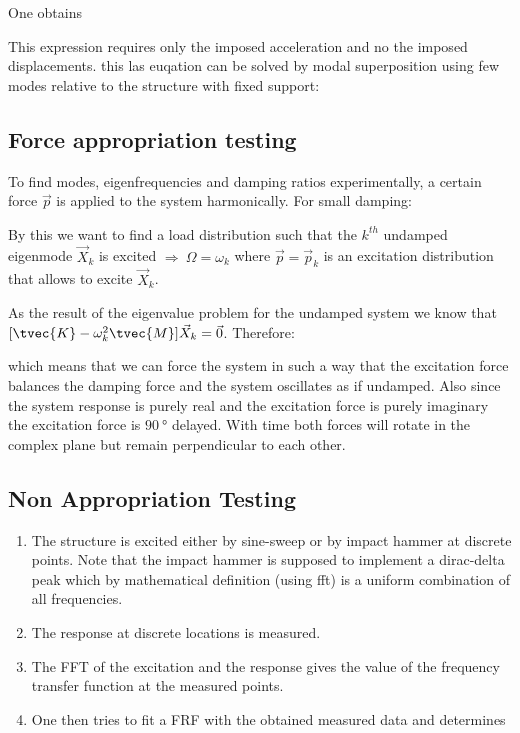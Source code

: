 \documentclass[10pt,a4paper]{scrartcl}
\begin{document}
\begin{multicols*}{2}
One obtains


This expression requires only the imposed acceleration and no the imposed displacements. this las euqation can be solved by modal superposition using few modes relative to the structure with fixed support:


\subsection{Force appropriation testing}

To find modes, eigenfrequencies and damping ratios experimentally, a certain force $\vec{p}$  is applied to the system harmonically. For small damping:


By this we want to find a load distribution such that the $k^{th}$ undamped eigenmode $\vec{X}_k$ is excited $\Longrightarrow\ \Omega=\omega_k$ where $\vec{p}=\vec{p}_k$ is an excitation distribution that allows to excite $\vec{X}_k$.


As the result of the eigenvalue problem for the undamped system we know that ${[\tvec{K}-\omega_k^2\tvec{M}]\vec{X}_k=\vec{0}}$. Therefore:


which means that we can force the system in such a way that the excitation force balances the damping force and the system oscillates as if undamped. Also since the system response is purely real and the excitation force is purely imaginary the excitation force is $\SI{90}{\degree}$ delayed. With time both forces will rotate in the complex plane but remain perpendicular to each other.


\subsection{Non Appropriation Testing}

\begin{enumerate}
\item The structure is excited either by sine-sweep or by impact hammer at discrete points. Note that the impact hammer is supposed to implement a dirac-delta peak which by mathematical definition (using fft) is a uniform combination of all frequencies.
\item The response at discrete locations is measured.
\item The FFT of the excitation and the response gives the value of the frequency transfer function at the measured points.
\item One then tries to fit a FRF with the obtained measured data and determines


\end{enumerate}
\end{multicols*}
\end{document}
